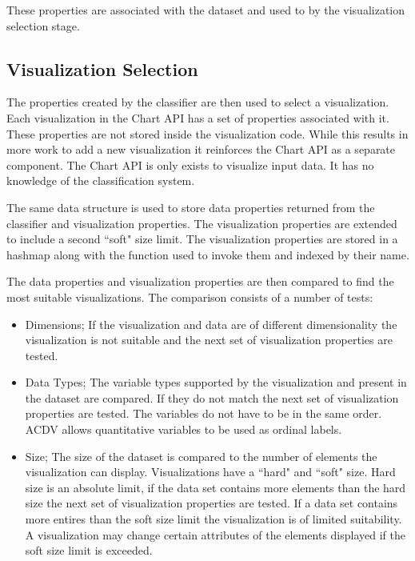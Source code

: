 \documentclass[a4paper, 11pt, titlepage, onehalfspacing]{report}
\begin{document}
These properties are associated with the dataset and used to by the visualization selection stage.

\subsection{Visualization Selection}
The properties created by the classifier are then used to select a visualization. Each visualization in the Chart API has a set of properties associated with it. These properties are not stored inside the visualization code. While this results in more work to add a new visualization it reinforces the Chart API as a separate component. The Chart API is only exists to visualize input data. It has no knowledge of the classification system.

The same data structure is used to store data properties returned from the classifier and visualization properties. The visualization properties are extended to include a second ``soft" size limit. The visualization properties are stored in a hashmap along with the function used to invoke them and indexed by their name. 

The data properties and visualization properties are then compared to find the most suitable visualizations. The comparison consists of a number of tests:
\begin{itemize}
\item Dimensions; If the visualization and data are of different dimensionality the visualization is not suitable and the next set of visualization properties are tested.
\item Data Types; The variable types supported by the visualization and present in the dataset are compared. If they do not match the next set of visualization properties are tested. The variables do not have to be in the same order. AC\lightning{}DV allows quantitative variables to be used as ordinal labels.
\item Size; The size of the dataset is compared to the number of elements the visualization can display. Visualizations have a ``hard" and ``soft" size. Hard size is an absolute limit, if the data set contains more elements than the hard size the next set of visualization properties are tested. If a data set contains more entires than the soft size limit the visualization is of limited suitability. A visualization may change certain attributes of the elements displayed if the soft size limit is exceeded.
\end{itemize}
\end{document}
